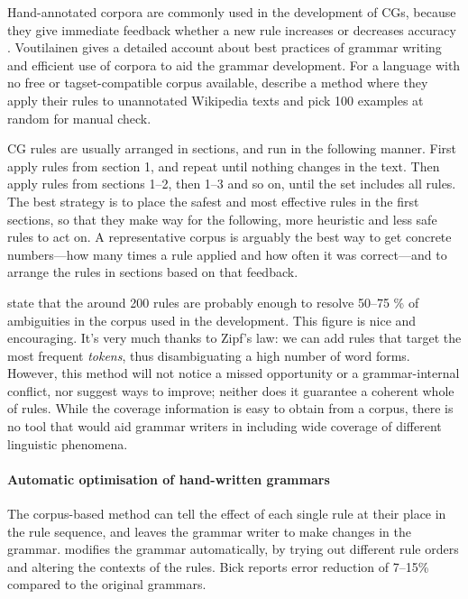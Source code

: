 Hand-annotated corpora are commonly used in the development of CGs, because they give immediate feedback whether a new rule increases or decreases accuracy \cite{voutilainen2004}.
Voutilainen gives a detailed account about best practices of grammar writing and efficient use of corpora to aid the grammar development.
For a language with no free or tagset-compatible corpus available, \cite{tyers_reynolds2015} describe a method where they apply their rules to unannotated Wikipedia texts and pick 100 examples at random for manual check.

CG rules are usually arranged in sections, and run in the following manner. 
First apply rules from section 1, and repeat until nothing changes in the text. Then apply rules from sections 1--2, then 1--3 and so on, until the set includes all rules.
The best strategy is to place the safest and most effective rules in the first sections,
so that they make way for the following, more heuristic and less safe rules to act on.
A representative corpus is arguably the best way to get concrete numbers---how many times a rule applied and how often it was correct---and to arrange the rules in sections based on that feedback.

\cite{voutilainen2004} state that the around 200 rules are probably enough to resolve 50--75 \% of ambiguities in the corpus used in the development. 
This figure is nice and encouraging. It's very much thanks to Zipf's law: we can add rules that target the most frequent \emph{tokens}, thus disambiguating a high number of word forms.
However, this method will not notice a missed opportunity or a grammar-internal conflict, nor suggest ways to improve; neither does it guarantee a coherent whole of rules. 
While the coverage information is easy to obtain from a corpus, there is no tool that would aid grammar writers in including wide coverage of different linguistic phenomena.




\paragraph{Automatic optimisation of hand-written grammars }

The corpus-based method can tell the effect of each single rule at their place in the rule sequence, and leaves the grammar writer to make changes in the grammar.
\cite{bick2013tuning} modifies the grammar automatically, by trying
out different rule orders and altering the contexts of the rules. 
Bick reports error reduction of 7--15\% compared to the original grammars.

